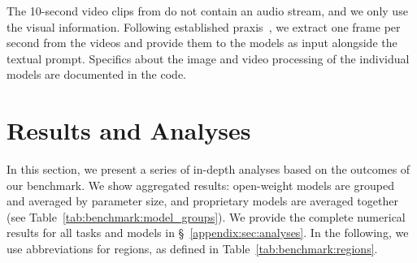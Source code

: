 %
The 10-second video clips from \vvqa do not contain an audio stream, and we only use the visual information.
%
Following established praxis~\cite[e.g.,][]{wang2024qwen2vl}, we extract one frame per second from the videos and provide them to the models as input alongside the textual prompt.
%
Specifics about the image and video processing of the individual models are documented in the code.
%

\section{Results and Analyses}
\label{sec:analyses}
%
In this section, we present a series of in-depth analyses based on the outcomes of our benchmark.
%
We show aggregated results: open-weight models are grouped and averaged by parameter size, and proprietary models are averaged together (see Table~\ref{tab:benchmark:model_groups}).
%
We provide the complete numerical results for all tasks and models in \S~\ref{appendix:sec:analyses}.
%
In the following, we use abbreviations for regions‚ as defined in Table~\ref{tab:benchmark:regions}.

%

%

%

%

%

